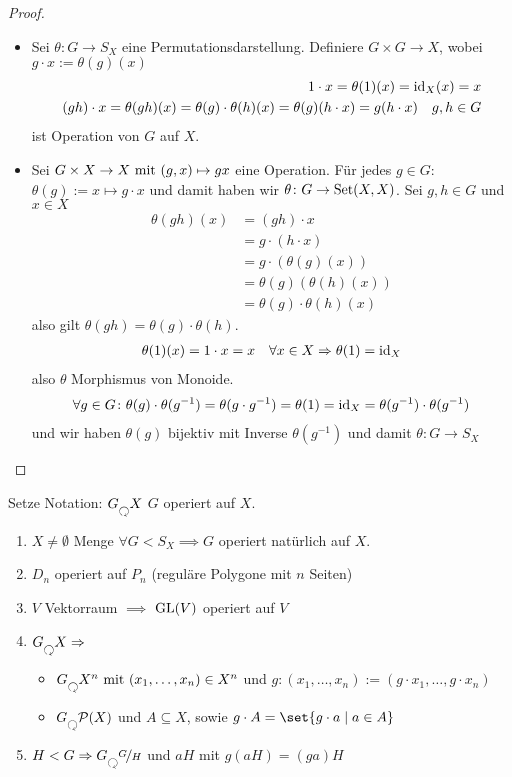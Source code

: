 \begin{proof}
	\begin{itemize}
		\item Sei $\theta\colon G \to S_X$ eine Permutationsdarstellung. Definiere $G\times G \to X$, wobei $g \cdot x := \theta(g)(x)$
		\begin{align*}
			1 \cdot x = \theta(1)(x) = \id_X(x) = x\\
			(gh)\cdot x = \theta(gh)(x) = \theta(g)\cdot\theta(h)(x) = \theta(g)(h\cdot x) = g(h\cdot x) \quad g,h \in G
		\end{align*}
		ist Operation von $G$ auf $X$.
		\item Sei $G \times X \to X \mit (g,x) \mapsto g x$ eine Operation. Für jedes $g \in G$: $\theta(g):= x \mapsto g \cdot x$ und damit haben wir $\theta\colon G \to \Set(X,X)$. Sei $g,h \in G$ und $x \in X$
		\begin{align*}
			\theta(gh)(x) &= (gh)\cdot x\\
			&= g \cdot (h \cdot x)\\
			&= g\cdot (\theta(g)(x))\\
			&= \theta(g)(\theta(h)(x))\\
			&= \theta(g) \cdot \theta(h)(x)
		\end{align*}
		also gilt $\theta(gh) = \theta(g)\cdot \theta(h)$.
		\begin{align*}
			\theta(1)(x) = 1 \cdot x = x \quad \forall x \in X \implies \theta(1) = \id_X
		\end{align*}
		also $\theta$ Morphismus von Monoide.
		\begin{align*}
			\forall g \in G \colon \theta(g)\cdot \theta(g^{-1}) = \theta(g\cdot g^{-1}) = \theta(1) = \id_X = \theta(g^{-1}) \cdot \theta(g^{-1})
		\end{align*}
		und wir haben $\theta(g)$ bijektiv mit Inverse $\theta(g^{-1})$ und damit $\theta\colon G \to S_X$
	\end{itemize}
\end{proof}
\begin{*example}
	Setze Notation: $G \Circlearrowleft X$ $G$ operiert auf $X$.
	\begin{enumerate}
		\item $X \neq \emptyset$ Menge $\forall G < S_X \implies G$ operiert natürlich auf $X$.
		\item $D_n$ operiert auf $P_n$ (reguläre Polygone mit $n$ Seiten)
		\item $V$ Vektorraum $\implies$ $\GL(V)$ operiert auf $V$
		\item $G \Circlearrowleft X \implies$
		\begin{itemize}
			\item $G \Circlearrowleft X^n \mit (x_1, \dots, x_n) \in X^n$ und $g\colon (x_1, \dots, x_n) := (g\cdot x_1, \dots, g \cdot x_n)$
			\item $G \Circlearrowleft \powerset(X)$ und $A \subseteq X$, sowie $g \cdot A = \set{g\cdot a \mid a \in A}$
		\end{itemize}
		\item $H <G \implies G \Circlearrowleft \lnkset{G}{H}$ und $aH$ mit $g(aH) = (ga)H$
	\end{enumerate}
\end{*example}
